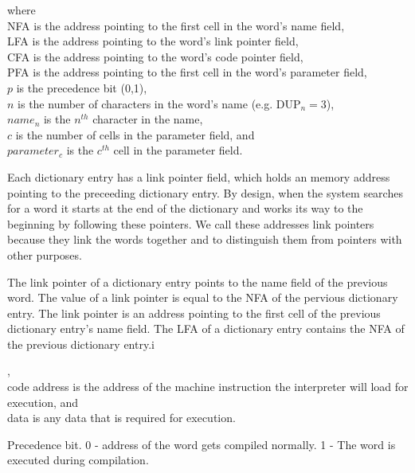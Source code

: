where \\
NFA is the address pointing to the first cell in the word's name field, \\
LFA is the address pointing to the word's link pointer field, \\
CFA is the address pointing to the word's code pointer field, \\
PFA is the address pointing to the first cell in the word's parameter field, \\
$p$ is the precedence bit (0,1), \\
$n$ is the number of characters in the word's name (e.g. DUP$_n = 3$), \\
$name_n$ is the $n^{th}$ character in the name, \\
$c$ is the number of cells in the parameter field, and \\
$parameter_c$ is the $c^{th}$ cell in the parameter field.

Each dictionary entry has a link pointer field, which holds an memory address pointing to the 
preceeding dictionary entry. By design, when the system searches for a word it starts 
at the end of the dictionary and works its way to the beginning by following these 
pointers. We call these addresses link pointers because they link the words together and to
distinguish them from pointers with other purposes.




The link pointer of a dictionary entry points to the name field of the previous word. The value of a link pointer is equal to the NFA of the pervious dictionary entry.
The link pointer is an address pointing to the first cell of the previous dictionary entry's name field. The LFA of a dictionary entry contains the NFA of the previous dictionary entry.i

, \\
code address is the address of the machine instruction the interpreter will load for
execution, and \\
data is any data that is required for execution.


Precedence bit. 0 - address of the word gets compiled normally. 1 - The word is executed 
during compilation.

